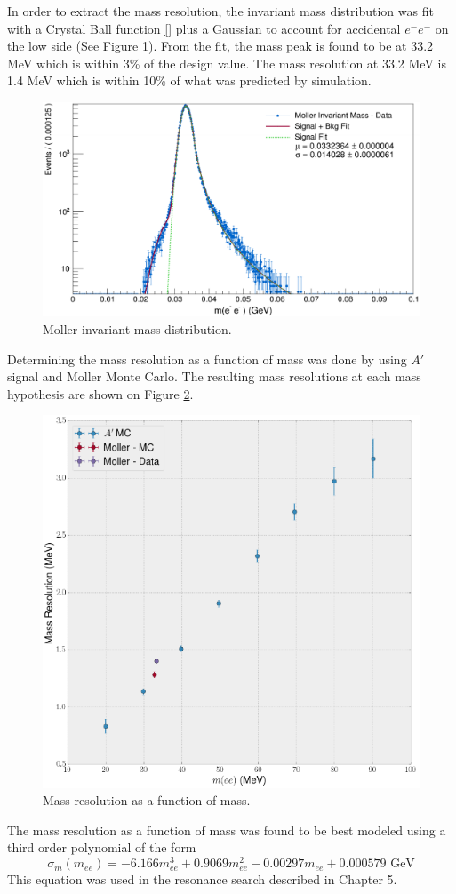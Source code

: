 In order to extract the mass resolution, the invariant mass distribution was 
fit with a Crystal Ball function \ref{} plus a Gaussian to account for accidental 
$e^-e^-$ on the low side (See Figure \ref{fig:moller_mass}).  From the 
fit, the mass peak is found to be at 33.2 MeV which is within 3\% of the design
value.  The mass resolution at 33.2 MeV is 1.4 MeV which is within 10\% of what
was predicted by simulation.
\begin{figure}[h!t]
    \centering
    \includegraphics[width=\textwidth]{images/moller_invariant_mass.png}
    \caption{Moller invariant mass distribution.}
    \label{fig:moller_mass}
\end{figure}

Determining the mass resolution as a function of mass was done by using $A'$ 
signal and Moller Monte Carlo. The resulting mass resolutions at each mass 
hypothesis are shown on Figure \ref{fig:mass_resolution}. 
\begin{figure}[h!t]
    \centering
    \includegraphics[width=.8\textwidth]{images/invariant_mass_curve.png}
    \caption{Mass resolution as a function of mass.}
    \label{fig:mass_resolution}
\end{figure}
The mass resolution as a function of mass was found to be best modeled using
a third order polynomial of the form
\begin{equation}
    \sigma_{m}(m_{ee}) = -6.166 m_{ee}^3 + 0.9069 m_{ee}^2 - 0.00297 m_{ee} + 0.000579 \text{ GeV}
\end{equation}
This equation was used in the resonance search described in Chapter 5. 

